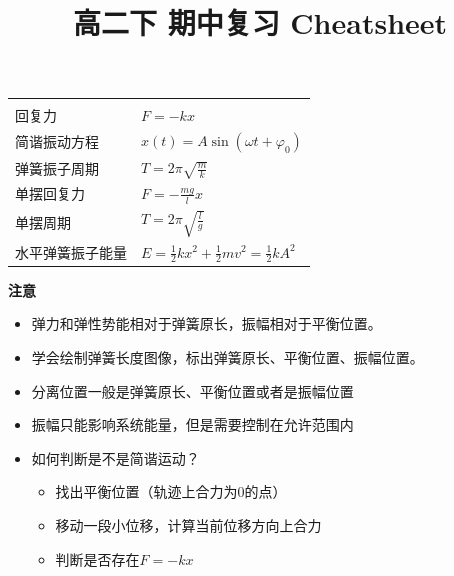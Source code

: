 \documentclass{cheatsheet}
\begin{document}
\title{高二下 期中复习 Cheatsheet}
\renewcommand{\arraystretch}{1.5}
\begin{tabularx}{\columnwidth}{XX}
	\rowcolor{blue!30}
	\multicolumn{2}{l}{\parbox[c][2.5\ht\strutbox][c]{0.9\columnwidth}{\Large 机械振动}} \\
	回复力      & $F=-kx$ \\
	简谐振动方程   & $x(t)=A\sin(\omega t+\varphi_0)$ \\
	弹簧振子周期   & $T=2\pi\sqrt{\frac{m}{k}}$\\
	单摆回复力    & $F=-\frac {mg}{l} x$ \\
	单摆周期     & $T=2\pi\sqrt{\frac{l}{g}}$ \\
	水平弹簧振子能量 & $E=\frac{1}{2}kx^2+\frac{1}{2}mv^2=\frac12kA^2$ \\
\end{tabularx}
\textbf{注意}
\begin{itemize}
	\item 弹力和弹性势能相对于弹簧原长，振幅相对于平衡位置。
	\item 学会绘制弹簧长度图像，标出弹簧原长、平衡位置、振幅位置。
	\item 分离位置一般是弹簧原长、平衡位置或者是振幅位置
	\item 振幅只能影响系统能量，但是需要控制在允许范围内
	\item 如何判断是不是简谐运动？
	\begin{itemize}
		\item [] 找出平衡位置（轨迹上合力为0的点）
		\item [] 移动一段小位移，计算当前位移方向上合力
		\item [] 判断是否存在$F=-kx$
	\end{itemize}
\end{itemize}
\end{document}
